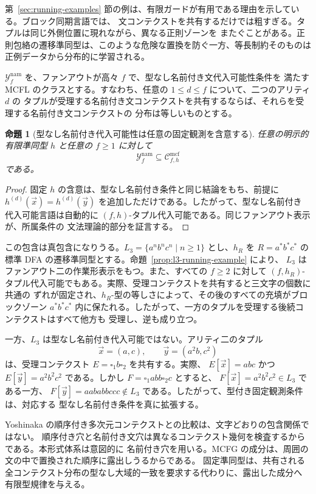 \documentclass[11pt,a4paper]{ltjsarticle}
\newtheorem{proposition}[theorem]{命題}
\theoremstyle{remark}
\newcommand{\Cmcf}[2]{\mathcal{C}^{\mathrm{mcf}}_{#1,#2}}
\newcommand{\Yclass}[1]{\mathcal{Y}_{#1}}
\newcommand{\tuple}[1]{\vec{#1}}
\newcommand{\blank}{\square}
\begin{document}
第~\ref{sec:running-examples} 節の例は、有限ガードが有用である理由を示している。ブロック同期言語では、
文コンテクストを共有するだけでは粗すぎる。タプルは同じ外側位置に現れながら、異なる正則ゾーンを
またぐことがある。正則包絡の遷移準同型は、このような危険な置換を防ぐ一方、等長制約そのものは
正例データから分布的に学習される。

\(\Yclass{f}^{\mathrm{nam}}\) を、ファンアウトが高々 \(f\) で、型なし名前付き文代入可能性条件を
満たす MCFL のクラスとする。すなわち、任意の \(1\le d\le f\) について、二つのアリティ \(d\) の
タプルが受理する名前付き文コンテクストを共有するならば、それらを受理する名前付き文コンテクストの
分布は等しいものとする。

\begin{proposition}[型なし名前付き代入可能性は任意の固定観測を含意する]
\label{prop:untyped-named-implies-fixed-h}
任意の明示的有限準同型 \(h\) と任意の \(f\ge1\) に対して
\[
  \Yclass{f}^{\mathrm{nam}}\subseteq \Cmcf{f}{h}
\]
である。
\end{proposition}

\begin{proof}
固定 \(h\) の含意は、型なし名前付き条件と同じ結論をもち、前提に
\(h^{(d)}(\tuple x)=h^{(d)}(\tuple y)\) を追加しただけである。したがって、型なし名前付き
代入可能言語は自動的に \((f,h)\)-タプル代入可能である。同じファンアウト表示が、所属条件の
文法理論的部分を証言する。
\end{proof}

この包含は真包含になりうる。\(L_3=\{a^n b^n c^n\mid n\ge1\}\) とし、\(h_R\) を
\(R=a^*b^*c^*\) の標準 DFA の遷移準同型とする。命題~\ref{prop:l3-running-example} により、
\(L_3\) はファンアウト二の作業形表示をもつ。また、すべての \(f\ge2\) に対して
\((f,h_R)\)-タプル代入可能でもある。実際、受理コンテクストを共有すると三文字の個数に共通の
ずれが固定され、\(h_R\)-型の等しさによって、その後のすべての充填がブロックゾーン
\(a^*b^*c^*\) 内に保たれる。したがって、一方のタプルを受理する後続コンテクストはすべて他方も
受理し、逆も成り立つ。

一方、\(L_3\) は型なし名前付き代入可能ではない。アリティ二のタプル
\[
  \tuple x=(a,c),
  \qquad
  \tuple y=(a^2b,c^2)
\]
は、受理コンテクスト \(E=\blank_1 b\blank_2\) を共有する。実際、
\(E[\tuple x]=abc\) かつ \(E[\tuple y]=a^2b^2c^2\) である。しかし
\(F=\blank_1 abb\blank_2 c\) とすると、
\(F[\tuple x]=a^2b^2c^2\in L_3\) である一方、
\(F[\tuple y]=aababbccc\notin L_3\) である。したがって、型付き固定観測条件は、対応する
型なし名前付き条件を真に拡張する。

Yoshinaka の順序付き多次元コンテクストとの比較は、文字どおりの包含関係ではない。
順序付き穴と名前付き文穴は異なるコンテクスト幾何を検査するからである。本形式体系は意図的に
名前付き穴を用いる。MCFG の成分は、周囲の文の中で置換された順序に露出しうるからである。
固定準同型は、共有される全コンテクスト分布の型なし大域的一致を要求する代わりに、露出した成分へ
有限型規律を与える。
\end{document}

